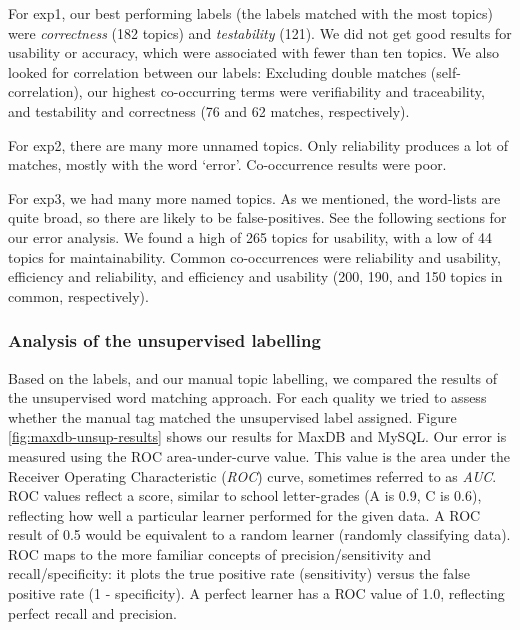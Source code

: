 \documentclass[]{sig-alternate}
\begin{document}
For \textsf{exp1}, our best performing labels (the labels matched with the most topics) were \emph{correctness} (182 topics) and \emph{testability} (121). We did not get good results for usability or accuracy, which were associated with fewer than ten topics. We also looked for correlation between our labels: Excluding double matches (self-correlation), our highest co-occurring terms were verifiability and traceability, and testability and correctness (76 and 62 matches, respectively).

For \textsf{exp2}, there are many more unnamed topics. Only reliability produces a lot of matches, mostly with the word `error'. Co-occurrence results were poor.

For \textsf{exp3}, we had many more named topics. As we mentioned, the word-lists are quite broad, so there are likely to be false-positives. See the following sections for our error analysis. We found a high of 265 topics for usability, with a low of 44 topics for maintainability. Common co-occurrences were reliability and usability, efficiency and reliability, and efficiency and usability (200, 190, and 150 topics in common, respectively). 


\subsubsection{Analysis of the unsupervised labelling}

\label{sec:unsuplabelling}

Based on the labels, and our manual topic labelling, we compared the results of the unsupervised word matching approach. For each quality we tried to assess whether the manual tag matched the unsupervised label assigned. Figure \ref{fig:maxdb-unsup-results} shows our results for MaxDB and MySQL. Our error is measured using the ROC area-under-curve value. This value is the area under the Receiver Operating Characteristic (\emph{ROC}) curve, sometimes referred to as \emph{AUC}. ROC values reflect a score, similar to school letter-grades (A is 0.9, C is 0.6), reflecting how well a particular learner performed for the given data. A ROC result of 0.5 would be equivalent to a random learner (randomly classifying data). ROC maps to the more familiar concepts of precision/sensitivity and recall/specificity: it plots the true positive rate (sensitivity) versus the false positive rate (1 - specificity). A perfect learner has a ROC value of 1.0, reflecting perfect recall and precision.
\end{document}
